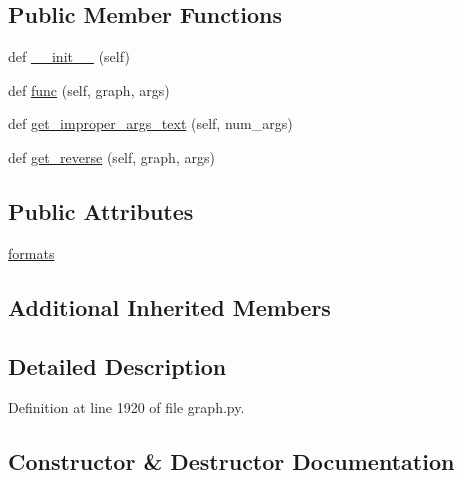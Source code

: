 \subsection*{Public Member Functions}
\begin{DoxyCompactItemize}
\item 
def \hyperlink{classlight__chats_1_1graph_1_1UnlockFunction_a307201afcd25d90e5c99badda71e0f02}{\+\_\+\+\_\+init\+\_\+\+\_\+} (self)
\item 
def \hyperlink{classlight__chats_1_1graph_1_1UnlockFunction_a60b9bd71f3b3d8255c9f79a3a408914f}{func} (self, graph, args)
\item 
def \hyperlink{classlight__chats_1_1graph_1_1UnlockFunction_a25cc5dcf53d2d9bc588ab635aeb376eb}{get\+\_\+improper\+\_\+args\+\_\+text} (self, num\+\_\+args)
\item 
def \hyperlink{classlight__chats_1_1graph_1_1UnlockFunction_a8527e0ee7a1f29a4daf4899451cdaa6f}{get\+\_\+reverse} (self, graph, args)
\end{DoxyCompactItemize}
\subsection*{Public Attributes}
\begin{DoxyCompactItemize}
\item 
\hyperlink{classlight__chats_1_1graph_1_1UnlockFunction_a8e80f007572fa2ce7624eca4ec645a56}{formats}
\end{DoxyCompactItemize}
\subsection*{Additional Inherited Members}


\subsection{Detailed Description}
\begin{DoxyVerb}
\end{DoxyVerb}
 

Definition at line 1920 of file graph.\+py.



\subsection{Constructor \& Destructor Documentation}
\mbox{\label{classlight__chats_1_1graph_1_1UnlockFunction_a307201afcd25d90e5c99badda71e0f02}} 
